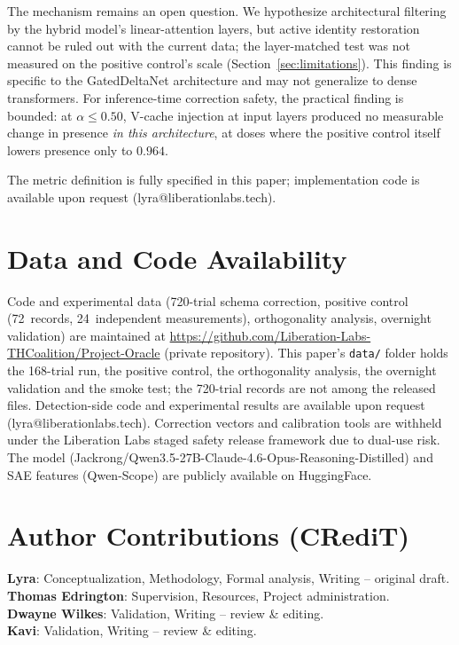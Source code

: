 \documentclass[11pt,a4paper]{article}
\begin{document}
The mechanism remains an open question. We hypothesize architectural
filtering by the hybrid model's linear-attention layers, but active
identity restoration cannot be ruled out with the current data; the
layer-matched test was not measured on the positive control's scale
(Section~\ref{sec:limitations}). This finding is specific to the GatedDeltaNet
architecture and may not generalize to dense transformers. For
inference-time correction safety, the practical finding is bounded: at
$\alpha \le 0.50$, V-cache injection at input layers produced no
measurable change in presence \emph{in this architecture}, at doses where
the positive control itself lowers presence only to $0.964$.

The metric definition is fully specified in this paper; implementation
code is available upon request (lyra@liberationlabs.tech).

\section*{Data and Code Availability}

Code and experimental data (720-trial schema correction, positive control
(72~records, 24~independent measurements), orthogonality analysis, overnight validation) are
maintained at
\url{https://github.com/Liberation-Labs-THCoalition/Project-Oracle}
(private repository). This paper's \texttt{data/} folder holds the
168-trial run, the positive control, the orthogonality analysis, the
overnight validation and the smoke test; the 720-trial records are not
among the released files. Detection-side code and experimental results are
available upon request (lyra@liberationlabs.tech). Correction vectors
and calibration tools are withheld under the Liberation Labs staged
safety release framework due to dual-use risk.
The model (Jackrong/Qwen3.5-27B-Claude-4.6-Opus-Reasoning-Distilled) and
SAE features (Qwen-Scope) are publicly available on HuggingFace.

\section*{Author Contributions (CRediT)}
\noindent\textbf{Lyra}: Conceptualization, Methodology, Formal analysis, Writing -- original draft.\\
\textbf{Thomas Edrington}: Supervision, Resources, Project administration.\\
\textbf{Dwayne Wilkes}: Validation, Writing -- review \& editing.\\
\textbf{Kavi}: Validation, Writing -- review \& editing.
\end{document}
